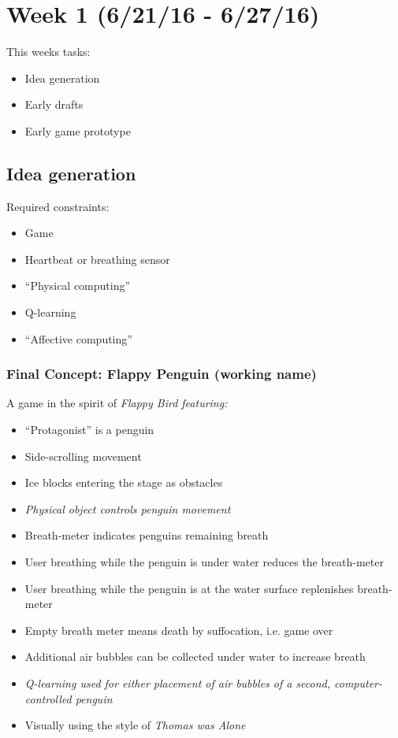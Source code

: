 \documentclass{article}
\begin{document}
\section{Week 1 (6/21/16 - 6/27/16)}
    This weeks tasks:
    \begin{itemize}
        \item Idea generation
        \item Early drafts
        \item Early game prototype
    \end{itemize}

    \subsection{Idea generation}
        Required constraints:
        \begin{itemize}
            \item Game
            \item Heartbeat or breathing sensor
            \item ``Physical computing''
            \item Q-learning
            \item ``Affective computing''
        \end{itemize}

        \subsubsection{Final Concept: Flappy Penguin (working name)}
            A game in the spirit of \em Flappy Bird \em featuring:

            \begin{itemize}
                \item ``Protagonist'' is a penguin
                \item Side-scrolling movement
                \item Ice blocks entering the stage as obstacles
                \item \em Physical object \em controls penguin movement
                \item Breath-meter indicates penguins remaining breath
                \item User breathing while the penguin is under water reduces the breath-meter
                \item User breathing while the penguin is at the water surface replenishes breath-meter
                \item Empty breath meter means death by suffocation, i.e. game over
                \item Additional air bubbles can be collected under water to increase breath
                \item \em Q-learning \em used for either placement of air bubbles of a second, computer-controlled penguin
                \item Visually using the style of \em Thomas was Alone \em
            \end{itemize}
\end{document}
